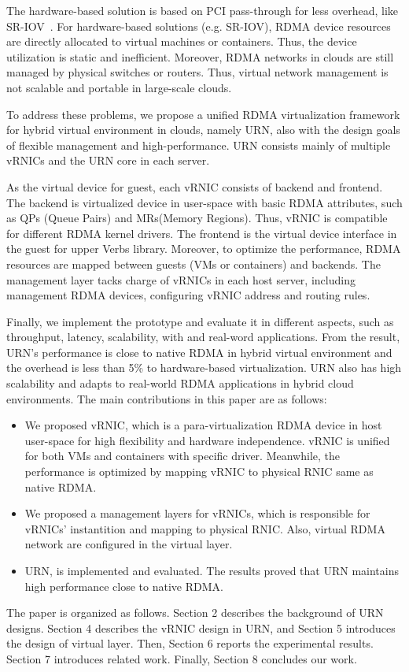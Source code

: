 The hardware-based solution is based on PCI pass-through for less overhead, like SR-IOV~\cite{sr-iov}. For hardware-based solutions (e.g. SR-IOV), RDMA device resources are directly allocated to virtual machines or containers. Thus, the device utilization is static and inefficient. Moreover, RDMA networks in clouds are still managed by physical switches or routers. Thus, virtual network management is not scalable and portable in large-scale clouds.

To address these problems, we propose a unified RDMA virtualization framework for hybrid virtual environment in clouds, namely URN, also with the design goals of flexible management and high-performance. URN consists mainly of multiple vRNICs and the URN core in each server.

As the virtual device for guest, each vRNIC consists of backend and frontend. The backend is virtualized device in user-space with basic RDMA attributes, such as QPs (Queue Pairs) and MRs(Memory Regions). Thus, vRNIC is compatible for different RDMA kernel drivers. The frontend is the virtual device interface in the guest for upper Verbs library. Moreover, to optimize the performance, RDMA resources are mapped between guests (VMs or containers) and backends. The management layer tacks charge of vRNICs in each host server, including management RDMA devices, configuring vRNIC address and routing rules. 

Finally, we implement the prototype and evaluate it in different aspects, such as throughput, latency, scalability, with and real-word applications. From the result, URN's performance is close to native RDMA in hybrid virtual environment and the overhead is less than 5\% to hardware-based virtualization. URN also has high scalability and adapts to real-world RDMA applications in hybrid cloud environments. The main contributions in this paper are as follows:

\begin{itemize}
\item We proposed vRNIC, which is a para-virtualization RDMA device in host user-space for high flexibility and hardware independence. vRNIC is unified for both VMs and containers with specific driver. Meanwhile, the performance is optimized by mapping vRNIC to physical RNIC same as native RDMA.

\item We proposed a management layers for vRNICs, which is responsible for vRNICs' instantition and mapping to physical RNIC. Also, virtual RDMA network are configured in the virtual layer.

\item URN, is implemented and evaluated. The results proved that URN maintains high performance close to native RDMA.
\end{itemize}

The paper is organized as follows. Section 2 describes the background of URN designs. Section 4 describes the vRNIC design in URN, and Section 5 introduces the design of virtual layer. Then, Section 6 reports the experimental results. Section 7 introduces related work. Finally, Section 8 concludes our work.
